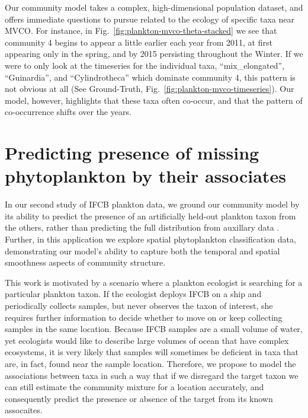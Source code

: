 Our community model takes a complex, high-dimensional population dataset, and offers immediate questions to pursue related to the ecology of specific taxa near MVCO. For instance, in Fig.~\ref{fig:plankton-mvco-theta-stacked} we see that community 4 begins to appear a little earlier each year from 2011, at first appearing only in the spring, and by 2015 persisting throughout the Winter. If we were to only look at the timeseries for the individual taxa, ``mix\_elongated'', ``Guinardia'', and ``Cylindrotheca'' which dominate community 4, this pattern is not obvious at all (See Ground-Truth, Fig.~\ref{fig:plankton-mvco-timeseries}). Our model, however, highlights that these taxa often co-occur, and that the pattern of co-occurrence shifts over the years.

\section{Predicting presence of missing phytoplankton by their associates} \label{sec:plankton-spatial-search}
In our second study of IFCB plankton data, we ground our community model by its ability to predict the presence of an artificially held-out plankton taxon from the others, rather than predicting the full distribution from auxillary data \citep{Kalmbach2017a}. Further, in this application we explore spatial phytoplankton classification data, demonstrating our model's ability to capture both the temporal and spatial smoothness aspects of community structure.

This work is motivated by a scenario where a plankton ecologist is searching for a particular plankton taxon. If the ecologist deploys IFCB on a ship and periodically collects samples, but never observes the taxon of interest, she requires further information to decide whether to move on or keep collecting samples in the same location. Because IFCB samples are a small volume of water, yet ecologists would like to describe large volumes of ocean that have complex ecosystems, it is very likely that samples will sometimes be deficient in taxa that are, in fact, found near the sample location. Therefore, we propose to model the associations between taxa in such a way that if we disregard the target taxon we can still estimate the community mixture for a location accurately, and consequently predict the presence or absence of the target from its known assocaites.

